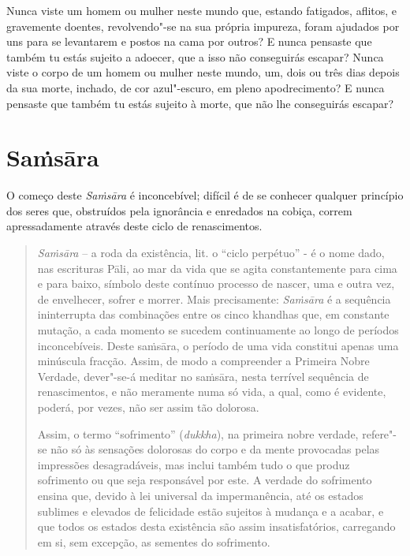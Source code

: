 Nunca viste um homem ou mulher neste mundo que, estando fatigados, aflitos, e
gravemente doentes, revolvendo"-se na sua própria impureza, foram ajudados por
uns para se levantarem e postos na cama por outros? E nunca pensaste que também
tu estás sujeito a adoecer, que a isso não conseguirás escapar? Nunca viste o
corpo de um homem ou mulher neste mundo, um, dois ou três dias depois da sua
morte, inchado, de cor azul"-escuro, em pleno apodrecimento? E nunca pensaste que
também tu estás sujeito à morte, que não lhe conseguirás escapar?


\section{Sa\.{m}sāra}

O começo deste \emph{Saṁsāra} é inconcebível; difícil é de se conhecer qualquer
princípio dos seres que, obstruídos pela ignorância e enredados na cobiça,
correm apressadamente através deste ciclo de renascimentos.


\begin{quote}
  \emph{Sa\.{m}sāra} -- a roda da existência, lit. o “ciclo perpétuo” - é o
  nome dado, nas escrituras Pāli, ao mar da vida que se agita constantemente
  para cima e para baixo, símbolo deste contínuo processo de nascer, uma e outra
  vez, de envelhecer, sofrer e morrer. Mais precisamente: \emph{Sa\.{m}sāra} é a
  sequência ininterrupta das combinações entre os cinco khandhas que, em
  constante mutação, a cada momento se sucedem continuamente ao longo de
  períodos inconcebíveis. Deste saṁsāra, o período de uma vida constitui apenas
  uma minúscula fracção. Assim, de modo a compreender a Primeira Nobre Verdade,
  dever"-se-á meditar no saṁsāra, nesta terrível sequência de renascimentos, e
  não meramente numa só vida, a qual, como é evidente, poderá, por vezes, não
  ser assim tão dolorosa.

  Assim, o termo “sofrimento” (\emph{dukkha}), na primeira nobre verdade,
  refere"-se não só às sensações dolorosas do corpo e da mente provocadas pelas
  impressões desagradáveis, mas inclui também tudo o que produz sofrimento ou
  que seja responsável por este. A verdade do sofrimento ensina que, devido à
  lei universal da impermanência, até os estados sublimes e elevados de
  felicidade estão sujeitos à mudança e a acabar, e que todos os estados desta
  existência são assim insatisfatórios, carregando em si, sem excepção, as
  sementes do sofrimento.
\end{quote}

